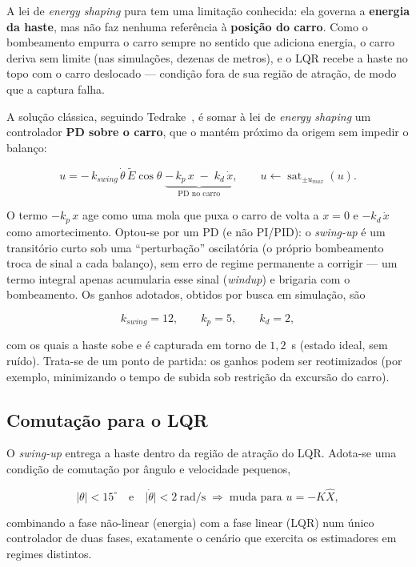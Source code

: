 \documentclass[brazil, 12pt]{article}
\begin{document}
A lei de \emph{energy shaping} pura tem uma limitação conhecida: ela governa a
\textbf{energia da haste}, mas não faz nenhuma referência à \textbf{posição do
carro}. Como o bombeamento empurra o carro sempre no sentido que adiciona
energia, o carro deriva sem limite (nas simulações, dezenas de metros), e o LQR
recebe a haste no topo com o carro deslocado --- condição fora de sua região de
atração, de modo que a captura falha.

A solução clássica, seguindo Tedrake~\cite{mit}, é somar à lei de
\emph{energy shaping} um controlador \textbf{PD sobre o carro},
que o mantém próximo da origem sem impedir o balanço:

\[
\boxed{\;u = -\,k_{swing}\,\dot{\theta}\,\tilde{E}\cos\theta
\;\underbrace{-\,k_p\,x\;-\;k_d\,\dot{x}}_{\text{PD no carro}},
\qquad u \leftarrow \operatorname{sat}_{\pm u_{max}}(u).\;}
\]

O termo $-k_p\,x$ age como uma mola que puxa o carro de volta a $x=0$ e
$-k_d\,\dot{x}$ como amortecimento. Optou-se por um PD (e não PI/PID): o
\emph{swing-up} é um transitório curto sob uma ``perturbação'' oscilatória (o
próprio bombeamento troca de sinal a cada balanço), sem erro de regime
permanente a corrigir --- um termo integral apenas acumularia esse sinal
(\emph{windup}) e brigaria com o bombeamento. Os ganhos adotados, obtidos por
busca em simulação, são

\[
k_{swing} = 12, \qquad k_p = 5, \qquad k_d = 2,
\]

com os quais a haste sobe e é capturada em torno de $1{,}2$~s (estado ideal, sem
ruído). Trata-se de um ponto de partida: os ganhos podem ser reotimizados
(por exemplo, minimizando o tempo de subida sob restrição da excursão do carro).

\subsection{Comutação para o LQR}

O \emph{swing-up} entrega a haste dentro da região de atração do LQR. Adota-se
uma condição de comutação por ângulo e velocidade pequenos,

\[
\lvert\theta\rvert < 15^{\circ}
\quad\text{e}\quad
\lvert\dot{\theta}\rvert < 2~\text{rad/s}
\;\Longrightarrow\;
\text{muda para } u = -K\hat{X},
\]

combinando a fase não-linear (energia) com a fase linear (LQR) num único
controlador de duas fases, exatamente o cenário que exercita os estimadores em
regimes distintos.
\end{document}
